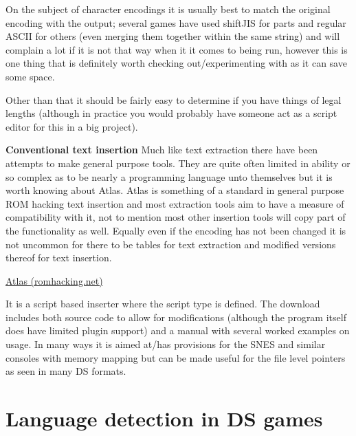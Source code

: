 \documentclass[
]{book}
\begin{document}
On the subject of character encodings it is usually best to match the original encoding with the output; several games have used shiftJIS for parts and regular ASCII for others (even merging them together within the same string) and will complain a lot if it is not that way when it it comes to being run, however this is one thing that is definitely worth checking out/experimenting with as it can save some space.

Other than that it should be fairly easy to determine if you have things of legal lengths (although in practice you would probably have someone act as a script editor for this in a big project).

\textbf{Conventional text insertion} Much like text extraction there have been attempts to make general purpose tools. They are quite often limited in ability or so complex as to be nearly a programming language unto themselves but it is worth knowing about Atlas. Atlas is something of a standard in general purpose ROM hacking text insertion and most extraction tools aim to have a measure of compatibility with it, not to mention most other insertion tools will copy part of the functionality as well. Equally even if the encoding has not been changed it is not uncommon for there to be tables for text extraction and modified versions thereof for text insertion.

\href{http://www.romhacking.net/reviews/62/}{Atlas (romhacking.net)}

It is a script based inserter where the script type is defined. The download includes both source code to allow for modifications (although the program itself does have limited plugin support) and a manual with several worked examples on usage. In many ways it is aimed at/has provisions for the SNES and similar consoles with memory mapping but can be made useful for the file level pointers as seen in many DS formats.

\hypertarget{language-detection-in-ds-games}{%
\section{Language detection in DS games}\label{language-detection-in-ds-games}}
\end{document}

